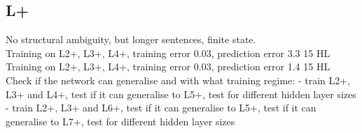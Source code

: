 \documentclass{article}
\begin{document}
\subsection{L+}

No structural ambiguity, but longer sentences, finite state.\\

Training on L2+, L3+, L4+, training error 0.03, prediction error 3.3 15 HL\\
Training on L2+, L3+, L4+, training error 0.03, prediction error 1.4 15 HL\\

Check if the network can generalise and with what training regime:
- train L2+, L3+ and L4+, test if it can generalise to L5+, test for different hidden layer sizes
- train L2+, L3+ and L6+, test if it can generalise to L5+, test if it can generalise to L7+, test for different hidden layer sizes

\end{document}

